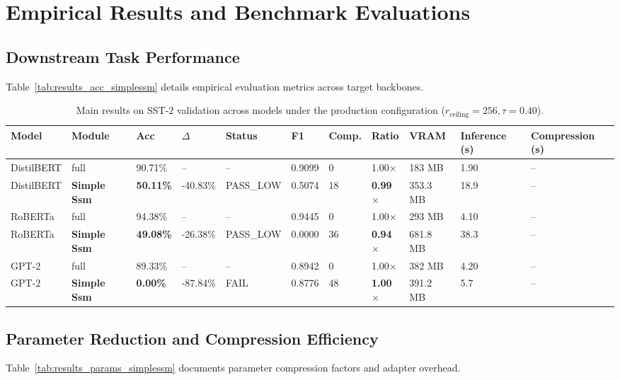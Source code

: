 \section{Empirical Results and Benchmark Evaluations}

\subsection{Downstream Task Performance}
Table~\ref{tab:results_acc_simplessm} details empirical evaluation metrics across target backbones.

\begin{table}[t]
\centering
\small
\begin{tabular}{lllllllllll}
\toprule
\textbf{Model} & \textbf{Module} & \textbf{Acc} & \textbf{$\Delta$} & \textbf{Status} & \textbf{F1} & \textbf{Comp.} & \textbf{Ratio} & \textbf{VRAM} & \textbf{Inference (s)} & \textbf{Compression (s)} \\
\midrule
DistilBERT & full & 90.71\% & -- & -- & 0.9099 & 0 & 1.00$\times$ & 183 MB & 1.90 & -- \\
DistilBERT & \textbf{Simple Ssm} & \textbf{50.11\%} & -40.83\% & PASS\_LOW & 0.5074 & 18 & \textbf{0.99$\times$} & 353.3 MB & 18.9 & -- \\
RoBERTa & full & 94.38\% & -- & -- & 0.9445 & 0 & 1.00$\times$ & 293 MB & 4.10 & -- \\
RoBERTa & \textbf{Simple Ssm} & \textbf{49.08\%} & -26.38\% & PASS\_LOW & 0.0000 & 36 & \textbf{0.94$\times$} & 681.8 MB & 38.3 & -- \\
GPT-2 & full & 89.33\% & -- & -- & 0.8942 & 0 & 1.00$\times$ & 382 MB & 4.20 & -- \\
GPT-2 & \textbf{Simple Ssm} & \textbf{0.00\%} & -87.84\% & FAIL & 0.8776 & 48 & \textbf{1.00$\times$} & 391.2 MB & 5.7 & -- \\
\bottomrule
\end{tabular}
\caption{Main results on SST-2 validation across models under the production configuration ($r_{\mathrm{ceiling}}=256, \tau=0.40$).}
\label{tab:main_sst2}
\end{table}

\subsection{Parameter Reduction and Compression Efficiency}
Table~\ref{tab:results_params_simplessm} documents parameter compression factors and adapter overhead.

